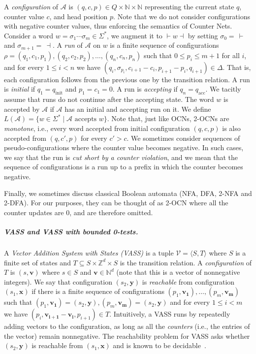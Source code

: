 \documentclass[USenglish]{lipics-v2021}
\newcommand{\tup}[1]{\langle #1 \rangle}
\newcommand{\lmark}{\vdash}
\newcommand{\rmark}{\dashv}
\newcommand{\initstate}{q_{\mathrm{init}}}
\newcommand{\accstate}{q_{\mathrm{acc}}}
\renewcommand{\vec}[1]{\boldsymbol{#1}}
\newcommand{\bbN}{\mathbb{N}}
\newcommand{\bbZ}{\mathbb{Z}}
\newcommand{\cA}{\mathcal{A}}
\newcommand{\cV}{\mathcal{V}}
\begin{document}
	A \emph{configuration} of $\cA$ is $(q,c,p)\in Q\times \bbN\times \bbN$ representing the
	current state $q$, counter value $c$, and head position $p$. Note that we do not
	consider configurations with negative counter values, thus enforcing the
	semantics of Counter Nets.
	Consider a word $w=\sigma_1\cdots \sigma_m\in \Sigma^*$, we augment it to $\lmark w\rmark$ by setting
	$\sigma_0=\,\lmark$ and $\sigma_{m+1}=\,\rmark$.  A \emph{run} of $\cA$ on $w$ is a finite
	sequence of configurations $\rho=(q_1,c_1,p_1),(q_2,c_2,p_2),\ldots,(q_{n},c_{n},p_{n})$
	such that $0\le p_i\le m+1$ for all \(i\), and for every $1\le i< n$ we have
	$(q_{i},\sigma_{p_i},c_{i+1}-c_i,p_{i+1}-p_i,q_{i+1})\in \Delta$. That is, each
	configuration follows from the previous one by the transition relation.  A run
	is \emph{initial} if $q_1=\initstate$ and $p_1=c_1=0$. A run is \emph{accepting}
	if $q_n=\accstate$. We tacitly assume that runs do not continue after the
	accepting state. The word $w$ is accepted by $\cA$ if $\cA$ has an initial and accepting
	run on it. We define $L(\cA)=\{w\in \Sigma^* \mid \cA \text{ accepts }w\}$. Note that, just like OCNs, 2-OCNs are \emph{monotone}, i.e., every word accepted from initial configuration $(q,c,p)$ is also accepted from $(q,c',p)$ for every $c'>c$. We sometimes
	consider sequences of pseudo-configurations where the counter value becomes
	negative. In such cases, we say that the run is \emph{cut short by a counter
		violation}, and we mean that the sequence of configurations is a run up to a
	prefix in which the counter becomes negative.
	
	Finally, we sometimes discuss classical Boolean automata (NFA, DFA, 2-NFA and
	2-DFA). For our purposes, they can be thought of as 2-OCN where all the counter
	updates are $0$, and are therefore omitted.
	
	
	\subparagraph*{VASS and VASS with bounded 0-tests.} A \emph{Vector Addition
		System with States (VASS)} is a tuple $\cV=\tup{S,T}$ where $S$ is a finite
	set of states and $T\subseteq S\times \bbZ^d\times S$ is the transition relation. A
	\emph{configuration} of $T$ is $(s,\vec{v})$ where $s\in S$ and
	$\vec{v}\in \bbN^d$ (note that this is a vector of nonnegative integers). We say
	that configuration $(s_2,\vec{y})$ is \emph{reachable} from configuration
	$(s_1,\vec{x})$ if there is a finite sequence of configurations
	$(p_1,\vec{v_1}),\ldots,(p_m,\vec{v_m})$ such that
	$(p_1,\vec{v_1})=(s_2,\vec{y}), (p_m,\vec{v_m})=(s_2,\vec{y})$ and for every
	$1\le i<m$ we have $(p_i,\vec{v_{i+1}}-\vec{v_i},p_{i+1})\in T$.  Intuitively, a
	VASS runs by repeatedly adding vectors to the configuration, as long as all the
	\emph{counters} (i.e., the entries of the vector) remain nonnegative.  The
	reachability problem for VASS asks whether $(s_2,\vec{y})$ is reachable from
	$(s_1,\vec{x})$ and is known to be decidable~\cite{czerwinski2022reachability}.
	
\end{document}
